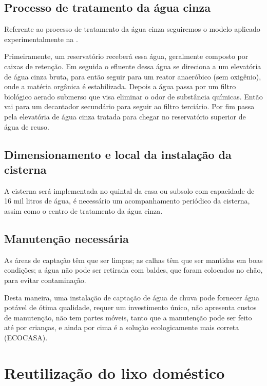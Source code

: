 
\subsection{Processo de tratamento da água cinza}

	Referente ao processo de tratamento da água cinza seguiremos o modelo aplicado experimentalmente na \cite{UFES}.

	Primeiramente, um reservatório receberá essa água, geralmente composto por caixas de retenção. Em seguida o efluente dessa água se direciona a um elevatória de água cinza bruta, para então seguir para um reator anaeróbico (sem oxigênio), onde a matéria orgânica é estabilizada. Depois a água passa por um filtro biológico aerado submerso que visa eliminar o odor de substância químicas. Então vai para um decantador secundário para seguir ao filtro terciário. Por fim passa pela elevatória de água cinza tratada para chegar no reservatório superior de água de reuso.

\subsection{Dimensionamento e local da instalação da cisterna}

A cisterna será implementada no quintal da casa ou subsolo com capacidade de 16 mil litros de água, é necessário um acompanhamento periódico da cisterna, assim como o centro de tratamento da água cinza.

\subsection{Manutenção necessária}

	As áreas de captação têm que ser limpas; as calhas têm que ser mantidas em boas condições; a água não pode ser retirada com baldes, que foram colocados no chão, para evitar contaminação.

	Desta maneira, uma instalação de captação de água de chuva pode fornecer água potável de ótima qualidade, requer um investimento único, não apresenta custos de manutenção, não tem partes móveis, tanto que a manutenção pode ser feito até por crianças, e ainda por cima é a solução ecologicamente mais correta (ECOCASA).

\section{Reutilização do lixo doméstico}

